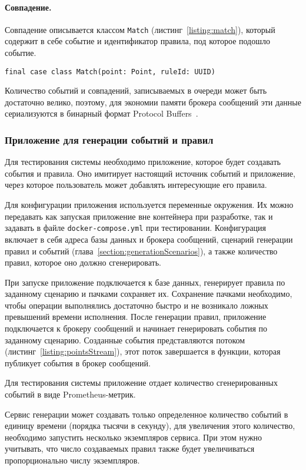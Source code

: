 \documentclass[14pt]{article}
\begin{document}
\paragraph{Совпадение.} Совпадение описывается классом \verb|Match| (листинг~\ref{listing:match}), который содержит в себе событие и идентификатор правила, под которое подошло событие.
\begin{lstlisting}[style=scalaStyle,caption={Класс, описывающий совпадение.},label={listing:match},captionpos=b, float]
final case class Match(point: Point, ruleId: UUID)
\end{lstlisting}

Количество событий и совпадений, записываемых в очереди может быть достаточно велико, поэтому, для экономии памяти брокера сообщений эти данные сериализуются в бинарный формат Protocol Buffers~\cite{protobuf}.

\subsubsection{Приложение для генерации событий и правил}
Для тестирования системы необходимо приложение, которое будет создавать события и правила. Оно имитирует настоящий источник событий и приложение, через которое пользователь может добавлять интересующие его правила.

Для конфигурации приложения используется переменные окружения. Их можно передавать как запуская приложение вне контейнера при разработке, так и задавать в файле \verb|docker-compose.yml| при тестировании. Конфигурация включает в себя адреса базы данных и брокера сообщений, сценарий генерации правил и событий (глава~\ref{section:generationScenarios}), а также количество правил, которое оно должно сгенерировать.

При запуске приложение подключается к базе данных, генерирует правила по заданному сценарию и пачками сохраняет их. Сохранение пачками необходимо, чтобы операции выполнялись достаточно быстро и не возникало ложных превышений времени исполнения. После генерации правил, приложение подключается к брокеру сообщений и начинает генерировать события по заданному сценарию. Созданные события представляются потоком (листинг~\ref{listing:pointsStream}), этот поток завершается в функции, которая публикует события в брокер сообщений.

Для тестирования системы приложение отдает количество сгенерированных событий в виде Prometheus-метрик.

Сервис генерации может создавать только определенное количество событий в единицу времени (порядка тысячи в секунду), для увеличения этого количество, необходимо запустить несколько экземпляров сервиса. При этом нужно учитывать, что число создаваемых правил также будет увеличиваться пропорционально числу экземпляров.
\end{document}

